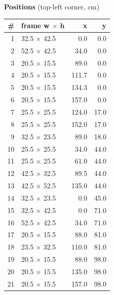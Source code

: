 \documentclass[a4paper,landscape,10pt]{article}
\begin{document}
\begin{minipage}[t]{0.25\textwidth}
\vspace{8pt}
{\bfseries Positions} (top-left corner, cm)\\[2pt]
\tiny
\begin{tabular}{@{}r l r r@{}}
\toprule
\# & frame w $\times$ h & x & y \\
\midrule
1 & 32.5 $\times$ 42.5 & 0.0 & 0.0 \\
2 & 52.5 $\times$ 42.5 & 34.0 & 0.0 \\
3 & 20.5 $\times$ 15.5 & 89.0 & 0.0 \\
4 & 20.5 $\times$ 15.5 & 111.7 & 0.0 \\
5 & 20.5 $\times$ 15.5 & 134.3 & 0.0 \\
6 & 20.5 $\times$ 15.5 & 157.0 & 0.0 \\
7 & 25.5 $\times$ 25.5 & 124.0 & 17.0 \\
8 & 25.5 $\times$ 25.5 & 152.0 & 17.0 \\
9 & 32.5 $\times$ 23.5 & 89.0 & 18.0 \\
10 & 25.5 $\times$ 25.5 & 34.0 & 44.0 \\
11 & 25.5 $\times$ 25.5 & 61.0 & 44.0 \\
12 & 42.5 $\times$ 32.5 & 89.5 & 44.0 \\
13 & 42.5 $\times$ 52.5 & 135.0 & 44.0 \\
14 & 32.5 $\times$ 23.5 & 0.0 & 45.0 \\
15 & 32.5 $\times$ 42.5 & 0.0 & 71.0 \\
16 & 52.5 $\times$ 42.5 & 34.0 & 71.0 \\
17 & 20.5 $\times$ 15.5 & 88.0 & 81.0 \\
18 & 23.5 $\times$ 32.5 & 110.0 & 81.0 \\
19 & 20.5 $\times$ 15.5 & 88.0 & 98.0 \\
20 & 20.5 $\times$ 15.5 & 135.0 & 98.0 \\
21 & 20.5 $\times$ 15.5 & 157.0 & 98.0 \\
\bottomrule
\end{tabular}
\end{minipage}
\clearpage
\end{document}
